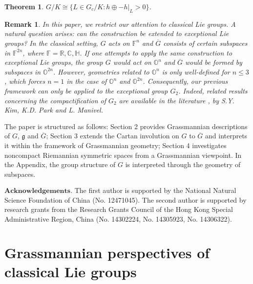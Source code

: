 \documentclass{article}
\newtheorem{thm}{Theorem}[section]
\newtheorem{rmk}{Remark}[section]
\begin{document}
\begin{thm}
$G/K  \cong \{L \in G_c/K: h\oplus-h|_L>0\}$.
\end{thm}

\begin{rmk}
In this paper, we restrict our attention to classical Lie groups. A natural question arises: can the construction be extended to exceptional Lie groups? In the classical setting,
$G$ acts on $\mathbb{F}^n$ and $\overline{G}$ consists of
certain subspaces in $\mathbb{F}^{2n}$, where $\mathbb{F}=\mathbb{R},\mathbb{C},\mathbb{H}$. If one attempts to apply the same construction to exceptional Lie groups,
the group $G$ would act on $\mathbb{O}^n$ and $\overline{G}$ would be formed by subspaces in $\mathbb{O}^{2n}$. However, geometries related to $\mathbb{O}^n$ is only well-defined for $n\leq 3$, which forces $n=1$
in the case of $\mathbb{O}^n$
and $\mathbb{O}^{2n}$. Consequently, our previous framework can only be applied to the exceptional group
$G_2$. Indeed, related results concerning the compactification of $G_2$ are available in the literature \cite{KP}\cite{Man2}, by S.Y. Kim,  K.D. Park and L. Manivel.
\end{rmk}



The paper is structured as follows: Section 2 provides Grassmannian descriptions of $G$, $\mathfrak{g}$ and $\overline{G}$;
Section 3 extends the Cartan involution on $G$ to $\overline{G} $ and interprets it within the framework of Grassmannian geometry;
Section 4 investigates noncompact Riemannian symmetric spaces from a Grassmannian viewpoint.
In the Appendix, the group structure of $G$ is interpreted through the geometry of subspaces.


\bigskip

$\mathbf{Acknowledgements.}$  The first author is supported by the National Natural
Science Foundation of China (No. 12471045). The second author is
supported by  research grants from the Research Grants Council of the Hong
Kong Special Administrative Region, China (No. 14302224, No. 14305923, No. 14306322).

\bigskip

\section{{\large Grassmannian perspectives of classical Lie groups}}
\end{document}
